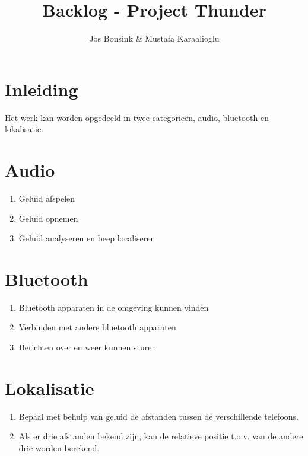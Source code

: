 \documentclass[12pt]{article}
\author{Jos Bonsink \& Mustafa Karaalioglu}
\begin{document}
\title{Backlog - Project Thunder}
\maketitle

\section*{Inleiding}
Het werk kan worden opgedeeld in twee categorie\"en, audio, bluetooth en lokalisatie.

\section*{Audio}
\begin{enumerate}
\item Geluid afspelen
\item Geluid opnemen
\item Geluid analyseren en beep localiseren
\end{enumerate}

\section*{Bluetooth}
\begin{enumerate}
\item Bluetooth apparaten in de omgeving kunnen vinden
\item Verbinden met andere bluetooth apparaten
\item Berichten over en weer kunnen sturen
\end{enumerate}

\section*{Lokalisatie}
\begin{enumerate}
\item Bepaal met behulp van geluid de afstanden tussen de verschillende telefoons.
\item Als er drie afstanden bekend zijn, kan de relatieve positie t.o.v. van de andere drie worden berekend.
\end{enumerate}
\end{document}

